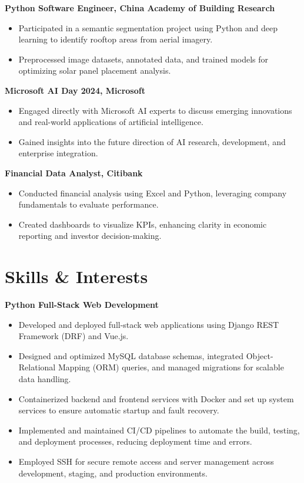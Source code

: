 \documentclass[11pt]{article}
\begin{document}
\textbf{Python Software Engineer, China Academy of Building Research}
\begin{itemize}
    \item Participated in a semantic segmentation project using Python and deep learning to identify rooftop areas from aerial imagery.
    \item Preprocessed image datasets, annotated data, and trained models for optimizing solar panel placement analysis.
\end{itemize}

\textbf{Microsoft AI Day 2024, Microsoft}
\begin{itemize}
    \item Engaged directly with Microsoft AI experts to discuss emerging innovations and real-world applications of artificial intelligence.
    \item Gained insights into the future direction of AI research, development, and enterprise integration.
\end{itemize}

\textbf{Financial Data Analyst, Citibank}
\begin{itemize}
    \item Conducted financial analysis using Excel and Python, leveraging company fundamentals to evaluate performance.
    \item Created dashboards to visualize KPIs, enhancing clarity in economic reporting and investor decision-making.
\end{itemize}

\section{Skills \& Interests}

\textbf{Python Full-Stack Web Development}
\begin{itemize}
    \item Developed and deployed full-stack web applications using Django REST Framework (DRF) and Vue.js.
    \item Designed and optimized MySQL database schemas, integrated Object-Relational Mapping (ORM) queries, and managed migrations for scalable data handling.
    \item Containerized backend and frontend services with Docker and set up system services to ensure automatic startup and fault recovery.
    \item Implemented and maintained CI/CD pipelines to automate the build, testing, and deployment processes, reducing deployment time and errors.
    \item Employed SSH for secure remote access and server management across development, staging, and production environments.
\end{itemize}
\end{document}
